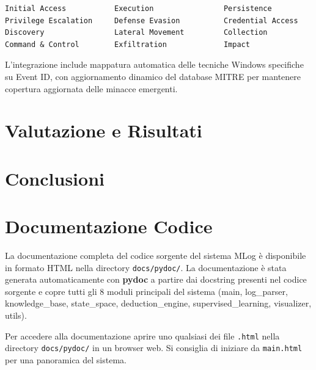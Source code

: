 \documentclass[12pt,a4paper]{report}
\theoremstyle{definition}
\begin{document}
\begin{verbatim}
Initial Access           Execution                Persistence          
Privilege Escalation     Defense Evasion          Credential Access    
Discovery                Lateral Movement         Collection           
Command & Control        Exfiltration             Impact               
\end{verbatim}

L'integrazione include mappatura automatica delle tecniche Windows specifiche su Event ID, con aggiornamento dinamico del database MITRE per mantenere copertura aggiornata delle minacce emergenti.

\chapter{Valutazione e Risultati}


\chapter{Conclusioni}


\appendix
\chapter{Documentazione Codice}

La documentazione completa del codice sorgente del sistema MLog è disponibile in formato HTML nella directory \texttt{docs/pydoc/}. La documentazione è stata generata automaticamente con \textbf{pydoc} a partire dai docstring presenti nel codice sorgente e copre tutti gli 8 moduli principali del sistema (main, log\_parser, knowledge\_base, state\_space, deduction\_engine, supervised\_learning, visualizer, utils).

Per accedere alla documentazione aprire uno qualsiasi dei file \texttt{.html} nella directory \texttt{docs/pydoc/} in un browser web. Si consiglia di iniziare da \texttt{main.html} per una panoramica del sistema.
\end{document}
